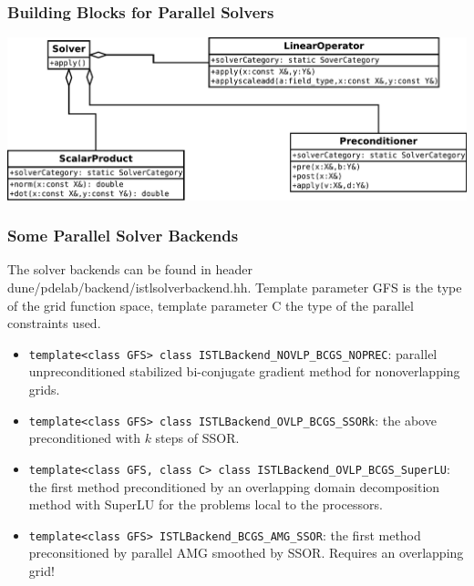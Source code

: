 \begin{frame}
  \frametitle<presentation>{Building Blocks for Parallel Solvers}
  \includegraphics[width=\textwidth]{EPS/istlsolver}
\end{frame}

\begin{frame}
  \frametitle{Some Parallel Solver Backends}
  The solver backends can be found in header
  dune/pdelab/backend/istlsolverbackend.hh. Template parameter GFS is
  the type of the grid function space, template parameter C the type
  of the parallel constraints used.
  \begin{itemize}
  \item \lstinline!template<class GFS> class ISTLBackend_NOVLP_BCGS_NOPREC!:
    parallel unpreconditioned
    stabilized bi-conjugate gradient method for nonoverlapping grids.
    \item \lstinline!template<class GFS> class ISTLBackend_OVLP_BCGS_SSORk!:
      the above preconditioned with $k$ steps of SSOR.
    \item \lstinline!template<class GFS, class C> class ISTLBackend_OVLP_BCGS_SuperLU!:
      the first method preconditioned by an overlapping domain
      decomposition method with SuperLU for the problems local to the
      processors.
      \item \lstinline!template<class GFS> ISTLBackend_BCGS_AMG_SSOR!:
        the first method preconsitioned by parallel AMG smoothed by
        SSOR. Requires an overlapping grid!
  \end{itemize}
\end{frame}

